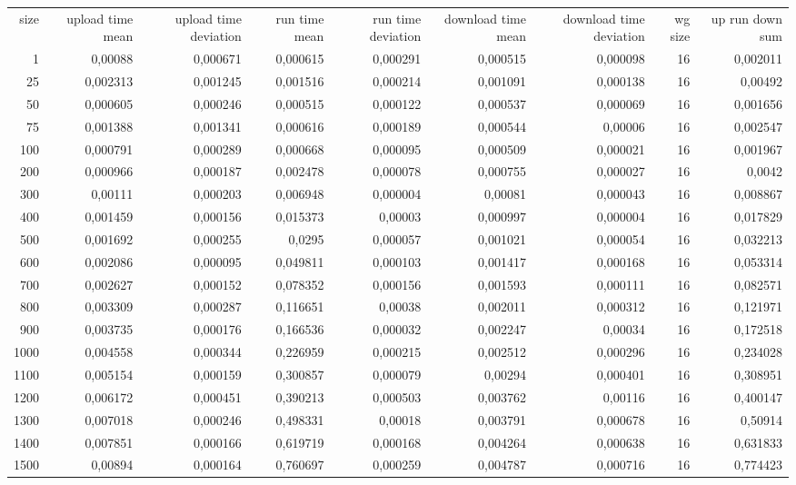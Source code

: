 \begin{tabular}{r r r r r r r r r}
size & upload time mean  & upload time deviation & run time mean & run time deviation & download time mean & download time deviation & wg size & up run down sum \\
1 & 0,00088 & 0,000671 & 0,000615 & 0,000291 & 0,000515 & 0,000098 & 16 & 0,002011 \\
25 & 0,002313 & 0,001245 & 0,001516 & 0,000214 & 0,001091 & 0,000138 & 16 & 0,00492 \\
50 & 0,000605 & 0,000246 & 0,000515 & 0,000122 & 0,000537 & 0,000069 & 16 & 0,001656 \\
75 & 0,001388 & 0,001341 & 0,000616 & 0,000189 & 0,000544 & 0,00006 & 16 & 0,002547 \\
100 & 0,000791 & 0,000289 & 0,000668 & 0,000095 & 0,000509 & 0,000021 & 16 & 0,001967 \\
200 & 0,000966 & 0,000187 & 0,002478 & 0,000078 & 0,000755 & 0,000027 & 16 & 0,0042 \\
300 & 0,00111 & 0,000203 & 0,006948 & 0,000004 & 0,00081 & 0,000043 & 16 & 0,008867 \\
400 & 0,001459 & 0,000156 & 0,015373 & 0,00003 & 0,000997 & 0,000004 & 16 & 0,017829 \\
500 & 0,001692 & 0,000255 & 0,0295 & 0,000057 & 0,001021 & 0,000054 & 16 & 0,032213 \\
600 & 0,002086 & 0,000095 & 0,049811 & 0,000103 & 0,001417 & 0,000168 & 16 & 0,053314 \\
700 & 0,002627 & 0,000152 & 0,078352 & 0,000156 & 0,001593 & 0,000111 & 16 & 0,082571 \\
800 & 0,003309 & 0,000287 & 0,116651 & 0,00038 & 0,002011 & 0,000312 & 16 & 0,121971 \\
900 & 0,003735 & 0,000176 & 0,166536 & 0,000032 & 0,002247 & 0,00034 & 16 & 0,172518 \\
1000 & 0,004558 & 0,000344 & 0,226959 & 0,000215 & 0,002512 & 0,000296 & 16 & 0,234028 \\
1100 & 0,005154 & 0,000159 & 0,300857 & 0,000079 & 0,00294 & 0,000401 & 16 & 0,308951 \\
1200 & 0,006172 & 0,000451 & 0,390213 & 0,000503 & 0,003762 & 0,00116 & 16 & 0,400147 \\
1300 & 0,007018 & 0,000246 & 0,498331 & 0,00018 & 0,003791 & 0,000678 & 16 & 0,50914 \\
1400 & 0,007851 & 0,000166 & 0,619719 & 0,000168 & 0,004264 & 0,000638 & 16 & 0,631833 \\
1500 & 0,00894 & 0,000164 & 0,760697 & 0,000259 & 0,004787 & 0,000716 & 16 & 0,774423 \\

\end{tabular}
